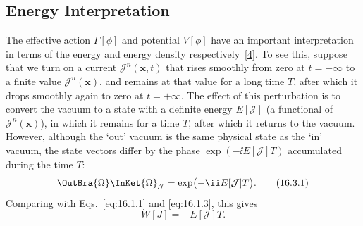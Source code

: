 \subsection{Energy Interpretation}

The effective action $\Gamma[\phi]$ and potential $V[\phi]$ have an important interpretation in terms of the energy and energy density respectively~\hyperref[ch16-ref-4]{[4]}. To see this, suppose that we turn on a current $\mathcal J^n(\mathbf{x},t)$ that rises smoothly from zero at $t=-\infty$ to a finite value $\mathcal J^n(\mathbf{x})$, and remains at that value for a long time $T$, after which it drops smoothly again to zero at $t=+\infty$. The effect of this perturbation is to convert the vacuum to a state with a definite energy $E[\mathcal J]$ (a functional of $\mathcal J^n(\mathbf{x})$), in which it remains for a time $T$, after which it returns to the vacuum. However, although the `out' vacuum is the same physical state as the `in' vacuum, the state vectors differ by the phase $\exp(-\ii E[\mathcal J]T)$ accumulated during the time $T$:
\begin{equation}
{\OutBra{\Omega}\InKet{\Omega}}_{\mathcal J}
=\exp\bigl(-\ii E[\mathcal J]T\bigr).
\tag{16.3.1}\label{eq:16.3.1}
\end{equation}
Comparing with Eqs.~\eqref{eq:16.1.1} and \eqref{eq:16.1.3}, this gives
\begin{equation}
W[J]=-E[\mathcal J]T.
\tag{16.3.2}\label{eq:16.3.2}
\end{equation}

